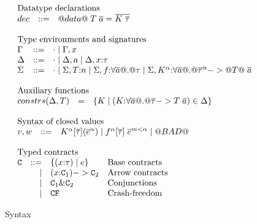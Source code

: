 \documentclass[preprint,nocopyrightspace]{sigplanconf}
\begin{document}
\begin{figure}
\[\begin{array}{l}
\begin{array}{lrll}
\multicolumn{3}{l}{\text{Datatype declarations}} \\
dec & ::= & @data@\;T\;\ol{a} = \ol{K\;\taus}
\end{array}\\ \\ 
\begin{array}{lrll}
\multicolumn{3}{l}{\text{Type environments and signatures}} \\
\Gamma & ::=  & \cdot \mid \Gamma,x \\
\Delta & ::=  & \cdot \mid \Delta,a \mid \Delta,x{:}\tau \\
\Sigma & ::=  & \cdot \mid \Sigma,T{:}n \mid \Sigma,f{:}\forall\ol{a} @.@ \tau \mid \Sigma,K^{\ar}{:}\forall\ol{a} @.@ \oln{\tau}{\ar} -> @T@\;\as
\end{array}\\ \\
\begin{array}{lrll}
\multicolumn{3}{l}{\text{Auxiliary functions}} \\
constrs(\Delta,T) & = & \{ K \mid (K{:}\forall \as @.@ \taus -> T\;\as) \in \Delta \} \\
\end{array}\\ \\ 
\begin{array}{lrll}
\multicolumn{3}{l}{\text{Syntax of closed values}} \\
 v,w & ::= & K^\ar[\ol{\tau}](\oln{e}{\ar}) \mid f^\ar[\ol{\tau}]\;\oln{e}{m < \ar} \mid @BAD@ \\ \\ 
\end{array} \\
\begin{array}{lrll}
\multicolumn{3}{l}{\text{Typed contracts}} \\
\Ct & ::=  & \{ (x{:}\tau) \mid e \}    & \text{Base contracts} \\ 
  & \mid &  (x{:}\Ct_1) -> \Ct_2        & \text{Arrow contracts} \\ 
  & \mid & \Ct_1 \& \Ct_2               & \text{Conjunctions}    \\ 
  & \mid & \CF                          & \text{Crash-freedom}  \\
\end{array} \\
\end{array}\]
\caption{Syntax}\label{fig:syntax}
\end{figure}
\end{document}
